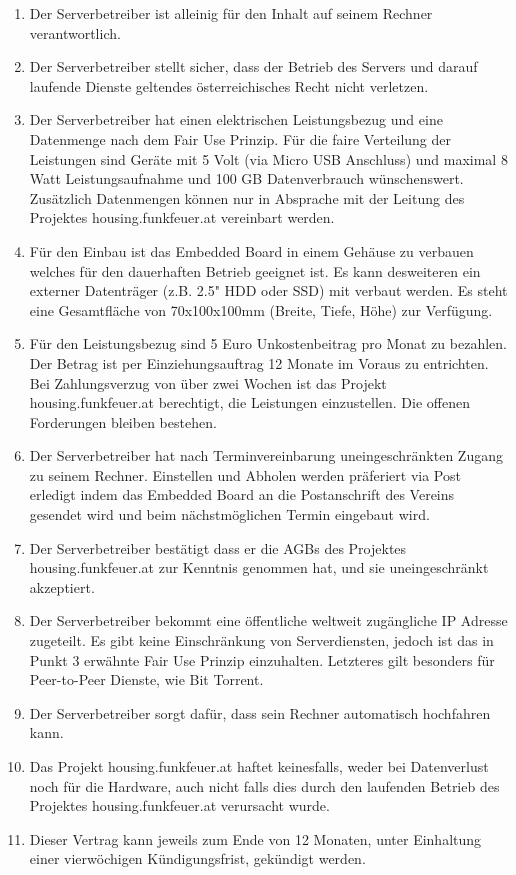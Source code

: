 \documentclass[parskip=half]{scrreprt}
\begin{document}
\begin{contract}
   \begin{enumerate}
\item Der Serverbetreiber ist alleinig für den Inhalt auf seinem Rechner verantwortlich.
\item Der Serverbetreiber stellt sicher, dass der Betrieb des Servers und darauf laufende Dienste geltendes österreichisches Recht nicht verletzen.
\item Der Serverbetreiber hat einen elektrischen Leistungsbezug und eine Datenmenge nach dem Fair Use Prinzip. Für die faire Verteilung der Leistungen sind Geräte mit 5 Volt (via Micro USB Anschluss) und maximal 8 Watt Leistungsaufnahme und 100 GB Datenverbrauch wünschenswert. Zusätzlich Datenmengen können nur in Absprache mit der Leitung des Projektes housing.funkfeuer.at vereinbart werden.
\item Für den Einbau ist das Embedded Board in einem Gehäuse zu verbauen welches für den dauerhaften Betrieb geeignet ist. Es kann desweiteren ein externer Datenträger (z.B. 2.5" HDD oder SSD) mit verbaut werden. Es steht eine Gesamtfläche von 70x100x100mm (Breite, Tiefe, Höhe) zur Verfügung.
\item Für den Leistungsbezug sind 5 Euro Unkostenbeitrag pro Monat zu bezahlen. Der Betrag ist per Einziehungsauftrag 12 Monate im Voraus zu entrichten. Bei Zahlungsverzug von über zwei Wochen ist das Projekt housing.funkfeuer.at berechtigt, die Leistungen einzustellen. Die offenen Forderungen bleiben bestehen.
\item Der Serverbetreiber hat nach Terminvereinbarung uneingeschränkten Zugang zu seinem Rechner. Einstellen und Abholen werden präferiert via Post erledigt indem das Embedded Board an die Postanschrift des Vereins gesendet wird und beim nächstmöglichen Termin eingebaut wird.
\item Der Serverbetreiber bestätigt dass er die AGBs des Projektes housing.funkfeuer.at zur Kenntnis genommen hat, und sie uneingeschränkt akzeptiert.
\item Der Serverbetreiber bekommt eine öffentliche weltweit zugängliche IP Adresse zugeteilt. Es gibt keine Einschränkung von Serverdiensten, jedoch ist das in Punkt 3 erwähnte Fair Use Prinzip einzuhalten. Letzteres gilt besonders für Peer-to-Peer Dienste, wie Bit Torrent.
\item Der Serverbetreiber sorgt dafür, dass sein Rechner automatisch hochfahren kann.
\item Das Projekt housing.funkfeuer.at haftet keinesfalls, weder bei Datenverlust noch für die Hardware, auch nicht falls dies durch den laufenden Betrieb des Projektes housing.funkfeuer.at verursacht wurde.
\item Dieser Vertrag kann jeweils zum Ende von 12 Monaten, unter Einhaltung einer vierwöchigen Kündigungsfrist, gekündigt werden.
\end{enumerate}
\end{contract}
\end{document}
